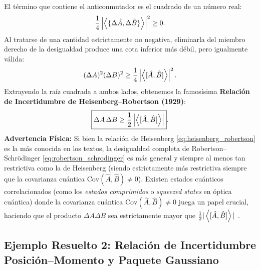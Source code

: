 \begin{alertabox}
    El término que contiene el anticonmutador es el cuadrado de un número real:
    \begin{equation}
        \frac{1}{4}\left|\left\langle \{\Delta\hat{A}, \Delta\hat{B}\} \right\rangle\right|^2 \ge 0.
    \end{equation}
    Al tratarse de una cantidad estrictamente no negativa, eliminarla del miembro derecho de la desigualdad produce una cota inferior más débil, pero igualmente válida:
    \begin{equation}
        (\Delta A)^2 (\Delta B)^2 \ge \frac{1}{4}\left|\left\langle [\hat{A}, \hat{B}] \right\rangle\right|^2.
    \end{equation}
    Extrayendo la raíz cuadrada a ambos lados, obtenemos la famosísima \textbf{Relación de Incertidumbre de Heisenberg--Robertson (1929)}:
    \begin{equation}
        \boxed{\Delta A \, \Delta B \ge \frac{1}{2}\left|\left\langle [\hat{A}, \hat{B}] \right\rangle\right|}.
        \label{eq:heisenberg_robertson}
    \end{equation}
    \textbf{Advertencia Física:} Si bien la relación de Heisenberg \eqref{eq:heisenberg_robertson} es la más conocida en los textos, la desigualdad completa de Robertson--Schrödinger \eqref{eq:robertson_schrodinger} es más general y siempre al menos tan restrictiva como la de Heisenberg (siendo estrictamente más restrictiva siempre que la covarianza cuántica $\mathrm{Cov}(\hat{A}, \hat{B}) \neq 0$). Existen estados cuánticos correlacionados (como los \textit{estados comprimidos} o \textit{squeezed states} en óptica cuántica) donde la covarianza cuántica $\mathrm{Cov}(\hat{A}, \hat{B}) \neq 0$ juega un papel crucial, haciendo que el producto $\Delta A \Delta B$ sea estrictamente mayor que $\frac{1}{2}|\left\langle [\hat{A}, \hat{B}] \right\rangle|$ \cite{ballentine}.
\end{alertabox}

\subsection{Ejemplo Resuelto 2: Relación de Incertidumbre Posición--Momento y Paquete Gaussiano}

